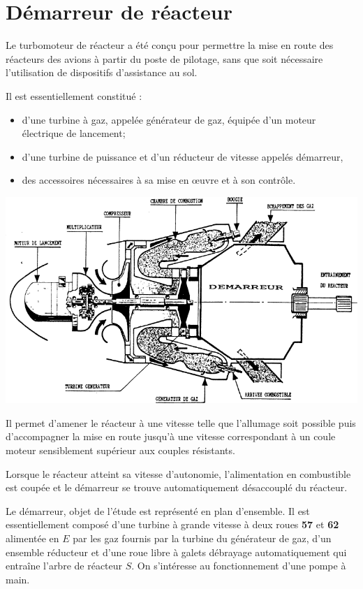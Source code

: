 \documentclass[10pt]{article}
\begin{document}



\section*{Démarreur de réacteur}

Le turbomoteur de réacteur a été conçu pour permettre la mise en route des réacteurs des avions à partir du poste de pilotage, sans que soit nécessaire l'utilisation de dispositifs d'assistance au sol. 

Il est essentiellement constitué :
\begin{itemize}
\item d'une turbine à gaz, appelée générateur de gaz, équipée d'un moteur électrique de lancement;
\item d'une turbine de puissance et d'un réducteur de vitesse appelés démarreur,
\item des accessoires nécessaires à sa mise en \oe{}uvre et à son contrôle. 
\end{itemize}

\begin{center}
\includegraphics[width=.65\textwidth]{images/fig1}
\end{center}

Il permet d'amener le réacteur à une vitesse telle que l'allumage soit possible puis d'accompagner la mise en route jusqu'à une vitesse correspondant à un coule moteur sensiblement supérieur aux couples résistants. 

Lorsque le réacteur atteint sa vitesse d'autonomie, l'alimentation en combustible est coupée et le démarreur se trouve automatiquement désaccouplé du réacteur. 

Le démarreur, objet de l'étude est représenté en plan d'ensemble. Il est essentiellement composé d'une turbine à grande vitesse à deux roues \textbf{57} et \textbf{62} alimentée en $E$ par les gaz fournis par la turbine du générateur de gaz, d'un ensemble réducteur et d'une roue libre à galets débrayage automatiquement qui entraîne l'arbre de réacteur $S$.
On s'intéresse au fonctionnement d'une pompe à main.
\end{document}

